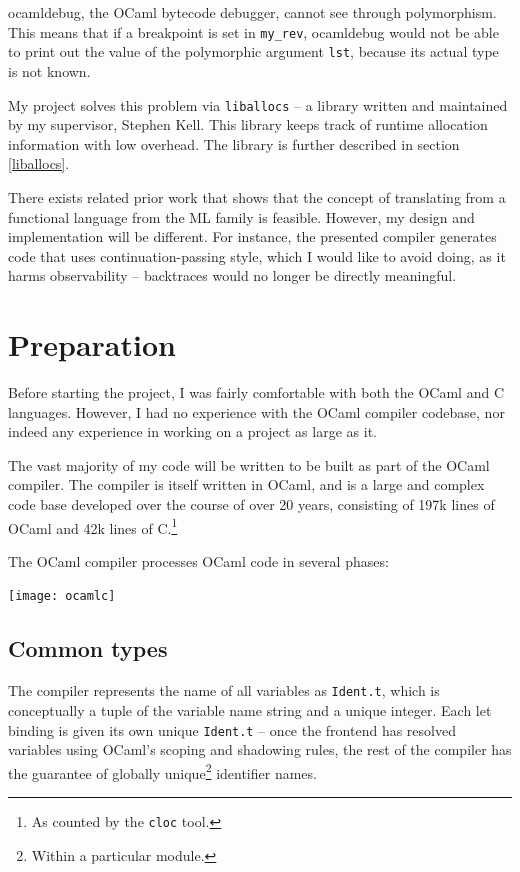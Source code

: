 \documentclass[12pt,a4paper,twoside,openright]{report}
\begin{document}
ocamldebug, the OCaml bytecode debugger, cannot see through
polymorphism. This means that if a breakpoint is set in \lstinline!my_rev!,
ocamldebug would not be able to print out the value of the polymorphic argument
\lstinline!lst!, because its actual type is not known.

My project solves this problem via \lstinline!liballocs! -- a library
written and maintained by my supervisor, Stephen Kell.\cite{kell} This library
keeps track of runtime allocation information with low overhead. The library is
further described in section \ref{liballocs}.

There exists related prior work \cite{tarditi90} that shows that the
concept of translating from a functional language from the ML family is
feasible. However, my design and implementation will be different.  For
instance, the presented compiler generates code that uses continuation-passing
style, which I would like to avoid doing, as it harms observability --
backtraces would no longer be directly meaningful.


\chapter{Preparation}

Before starting the project, I was fairly comfortable with both the OCaml and
C languages. However, I had no experience with the OCaml compiler codebase, nor
indeed any experience in working on a project as large as it.

The vast majority of my code will be written to be built as part of the OCaml
compiler. The compiler is itself written in OCaml, and is a large and complex
code base developed over the course of over 20 years, consisting of 197k lines
of OCaml and 42k lines of C.\footnote{As counted by the \lstinline!cloc! tool.}

The OCaml compiler processes OCaml code in several phases:

\begin{center}
  \texttt{[image: ocamlc]}
\end{center}


\section{Common types}\label{common-types}

The compiler represents the name of all variables as \lstinline!Ident.t!, which
is conceptually a tuple of the variable name string and a unique integer. Each
let binding is given its own unique \lstinline!Ident.t! -- once the frontend
has resolved variables using OCaml's scoping and shadowing rules, the rest of
the compiler has the guarantee of globally unique\footnote{Within a particular
module.} identifier names.
\end{document}
